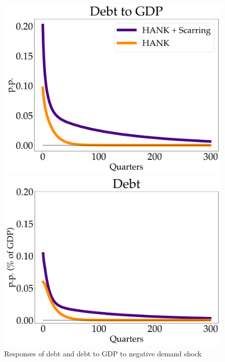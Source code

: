 \begin{figure}[!ht]
    \centering
   \begin{minipage}{0.47\textwidth}
        \centering
        \includegraphics[scale=.2]{text/chapter1/Figures/debt_to_GDP_IPR} %
    \end{minipage}\hfill
    \begin{minipage}{0.47\textwidth}
        \centering
        \includegraphics[scale=.2]{text/chapter1/Figures/debt_IPR} %
    \end{minipage}
    \caption{Responses of debt and debt to GDP to negative demand shock}
    \label{debt_to_GDP}
\end{figure}


